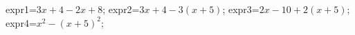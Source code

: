 \documentclass[exercice]{thedocument}%
\begin{document}
%
    \>expr1=$3x+4-2x+8$;%
    \>expr2=$3x+4-3(x+5)$;%
    \>expr3=$2x-10+2(x+5)$;%
    \>expr4=$x^2-(x+5)^2$;%
\end{document}

